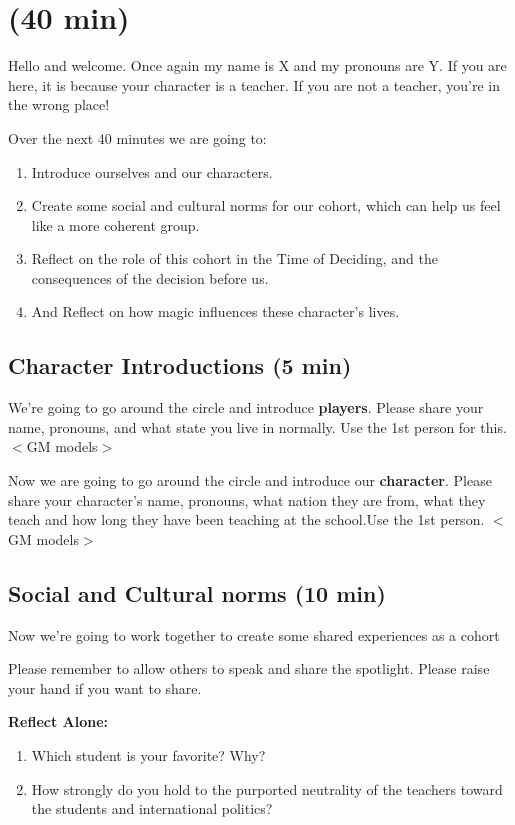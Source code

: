 \documentclass[green]{GL2020}
\begin{document}
\name{\gPreGameTeacher{}}

\section*{(40 min)}

Hello and welcome. Once again my name is X and my pronouns are Y. If you are here, it is because your character is a teacher. If you are not a teacher, you're in the wrong place!

Over the next 40 minutes we are going to:
\begin{enumerate}
	\item Introduce ourselves and our characters.
	\item Create some social and cultural norms for our cohort, which can help us feel like a more coherent group.
	\item Reflect on the role of this cohort in the Time of Deciding, and the consequences of the decision before us.
	\item And Reflect on how magic influences these character’s lives.
\end{enumerate}

\subsection*{Character Introductions (5 min)}
We’re going to go around the circle and introduce \textbf{players}. Please share your name, pronouns, and what state you live in normally. Use the 1st person for this. $<$GM models$>$

Now we are going to go around the circle and introduce our \textbf{character}. Please share your character’s name, pronouns, what nation they are from, what they teach and how long they have been teaching at the school.Use the 1st person. $<$GM models$>$

\subsection*{Social and Cultural norms (10 min)}
Now we’re going to work together to create some shared experiences as a cohort

Please remember to allow others to speak and share the spotlight.  Please raise your hand if you want to share.

\textbf{Reflect Alone:}
\begin{enumerate}
	\item Which student is your favorite? Why?
	\item How strongly do you hold to the purported neutrality of the teachers toward the students and international politics?
\end{enumerate}
\end{document}
